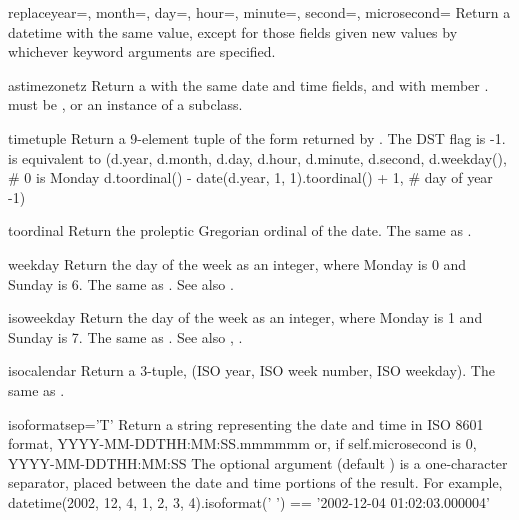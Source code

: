 \begin{methoddesc}{replace}{year=, month=, day=, hour=, minute=, second=, microsecond=}
    Return a datetime with the same value, except for those fields given
    new values by whichever keyword arguments are specified.
\end{methoddesc}

\begin{methoddesc}{astimezone}{tz}
    Return a  with the same date and time fields, and
    with  member .   must be ,
    or an instance of a  subclass.
\end{methoddesc}

\begin{methoddesc}{timetuple}{}
    Return a 9-element tuple of the form returned by
    .
    The DST flag is -1.    is equivalent to
        (d.year, d.month, d.day,
         d.hour, d.minute, d.second,
         d.weekday(),  \# 0 is Monday
         d.toordinal() - date(d.year, 1, 1).toordinal() + 1, \# day of year
         -1)
\end{methoddesc}

\begin{methoddesc}{toordinal}{}
    Return the proleptic Gregorian ordinal of the date.  The same as
    .
\end{methoddesc}

\begin{methoddesc}{weekday}{}
    Return the day of the week as an integer, where Monday is 0 and
    Sunday is 6.  The same as .
    See also .
\end{methoddesc}

\begin{methoddesc}{isoweekday}{}
    Return the day of the week as an integer, where Monday is 1 and
    Sunday is 7.  The same as .
    See also , .
\end{methoddesc}

\begin{methoddesc}{isocalendar}{}
    Return a 3-tuple, (ISO year, ISO week number, ISO weekday).  The
    same as .
\end{methoddesc}

\begin{methoddesc}{isoformat}{sep='T'}
    Return a string representing the date and time in ISO 8601 format,
        YYYY-MM-DDTHH:MM:SS.mmmmmm
    or, if self.microsecond is 0,
        YYYY-MM-DDTHH:MM:SS
    The optional argument  (default ) is a
    one-character separator, placed between the date and time portions
    of the result.  For example,
        datetime(2002, 12, 4, 1, 2, 3, 4).isoformat(' ') ==
        '2002-12-04 01:02:03.000004'
\end{methoddesc}

